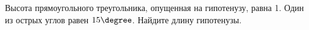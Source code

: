 \begin{ex}
	\begin{condition}
		Высота прямоугольного треугольника, опущенная на гипотенузу, равна 1. Один из острых углов равен \( 15\degree \). Найдите длину гипотенузы.
	\end{condition}
\end{ex}
